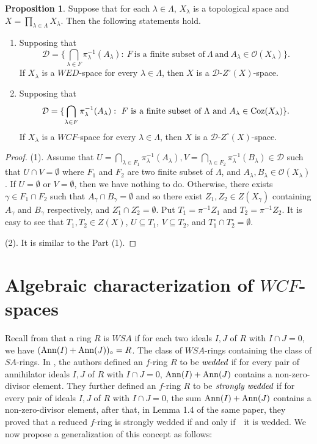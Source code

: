 \documentclass{amsart}
\theoremstyle{definition}
\theoremstyle{remark}
\numberwithin{equation}{section}
\newcommand{\CD}{\mathcal{D}}
\newcommand{\CO}{\mathcal{O}}
\newcommand{\Ann}{{\rm Ann}}
\newcommand{\coz}{{\rm Coz}}
\newcommand{\sub}{\supseteq}
\newcommand{\la}{\lambda}
\newcommand{\La}{\Lambda}
\newcommand{\ga}{\gamma}
\newcommand{\cc}{\circ}
\newcommand{\tohi}{\emptyset}
\newcommand{\bcap}{\bigcap}
\def\ifif {if and only if\ \ }
\def\sub {\subseteq}
\theoremstyle{definition}\newtheorem{thm}{Theorem}[section]
\theoremstyle{definition}\newtheorem{cor}[thm]{Corollary}
\theoremstyle{definition}\newtheorem{lem}[thm]{Lemma}
\theoremstyle{definition}\newtheorem{prop}[thm]{Proposition}
\theoremstyle{definition}\newtheorem{defn}[thm]{Definition}
\theoremstyle{definition}\newtheorem{Rem}[thm]{Remark}
\theoremstyle{remark}\newtheorem{rem}[thm]{Remark}
\theoremstyle{definition}\newtheorem{exam}[thm]{Example}
\theoremstyle{definition}\newtheorem{qu}[thm]{question}
\begin{document}
\begin{prop}\label{}
Suppose that for each $\la\in\La$, $X_\la$ is a topological space and $X=\prod_{\la\in\La}X_\la$. Then the following statements hold.
\begin{enumerate}
\item  Supposing that 
\[\CD=\{\bcap_{\la\in F}\pi_\la^{-1}(A_\la):~F~\text{is a finite subset of}~\La~\text{and}~A_\la\in\CO(X_\la)\}.\]
If $X_\la$ is a $WED$-space for every $\la\in\La$, then $X$ is a $\CD$-$Z^\cc(X)$-space.

\item Supposing that 
\[\CD=\{\bcap_{\la\in F}\pi_\la^{-1}(A_\la):~F~\text{is a finite subset of}~\La~\text{and}~A_\la\in\coz(X_\la)\}.\]
If $X_\la$ is a $WCF$-space for every $\la\in\La$, then $X$ is a $\CD$-$Z^\cc(X)$-space.
\end{enumerate}
\end{prop}
\begin{proof}
(1). Assume that $U=\bcap_{\la\in F_1}\pi_\la^{-1}(A_\la), V=\bcap_{\la\in F_2}\pi_\la^{-1}(B_\la)\in\CD$ such that $U\cap V=\tohi$ where $F_1$ and $F_2$ are two finite subset of $\La$, and $A_\la,B_\la\in\CO(X_\la)$. If $U=\tohi$ or $V=\tohi$, then we have nothing to do. Otherwise, there exists $\ga\in F_1\cap F_2$ such that $A_\ga\cap B_\ga=\tohi$ and so there exist $Z_1,Z_2\in Z(X_\ga)$ containing $A_\ga$ and $B_\ga$ respectively, and $Z_1^\cc\cap Z_2^\cc=\tohi$. Put $T_1=\pi^{-1}Z_1$ and $T_2=\pi^{-1}Z_2$. It is easy to see that $T_1,T_2\in Z(X)$, $U\sub T_1$, $V\sub T_2$, and $T_1^\cc\cap T_2^\cc=\tohi$.

(2). It is  similar to the Part (1).
\end{proof}



















\section{Algebraic characterization of $WCF$-spaces}

Recall from \cite{AT} that a ring $R$ is $WSA$ if for each two ideals $I, J$ of $R$ with $I\cap J=0$, we have $(\Ann(I)+\Ann(J))_{\circ}=R$. The class of $WSA$-rings containing the class of $SA$-rings. In \cite{DT}, the authors defined an $f$-ring $R$ to be  $\emph{wedded}$ if for every pair of annihilator ideals  $I, J$ of $R$ with $I\cap J=0$, $\Ann(I)+\Ann(J)$ contains a non-zero-divisor element. They further defined an $f$-ring $R$ to be  $\emph{strongly wedded}$ if for every pair of  ideals  $I, J$ of $R$ with $I\cap J=0$, the sum $\Ann(I)+\Ann(J)$ contains a non-zero-divisor element, after that, in Lemma 1.4 of the same paper, they proved   that a reduced $f$-ring is strongly wedded \ifif it is wedded. We now propose a generalization of this concept as follows:
\end{document}

